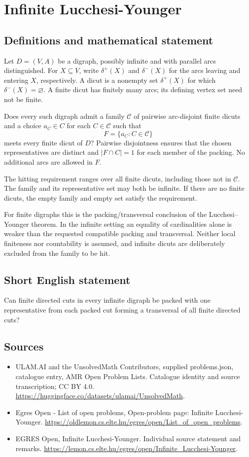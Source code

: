 \documentclass[11pt,a4paper]{article}
\begin{document}
\section*{Infinite Lucchesi-Younger}\label{statement}

\subsection{Definitions and mathematical statement}
Let $D=(V,A)$ be a digraph, possibly infinite and with parallel arcs
distinguished. For $X\subseteq V$, write $\delta^+(X)$ and
$\delta^-(X)$ for the arcs leaving and entering $X$, respectively.
A dicut is a nonempty set $\delta^+(X)$ for which
$\delta^-(X)=\varnothing$. A finite dicut has finitely many arcs;
its defining vertex set need not be finite.

Does every such digraph admit a family $\mathcal C$ of pairwise
arc-disjoint finite dicuts and a choice $a_C\in C$ for each
$C\in\mathcal C$ such that
\[
                  F=\{a_C:C\in\mathcal C\}
\]
meets every finite dicut of $D$? Pairwise disjointness ensures that
the chosen representatives are distinct and $|F\cap C|=1$ for each
member of the packing. No additional arcs are allowed in $F$.

The hitting requirement ranges over all finite dicuts, including those
not in $\mathcal C$. The family and its representative set may both
be infinite. If there are no finite dicuts, the empty family and empty
set satisfy the requirement.

For finite digraphs this is the packing/transversal conclusion of the
Lucchesi--Younger theorem. In the infinite setting an equality of
cardinalities alone is weaker than the requested compatible packing
and transversal. Neither local finiteness nor countability is assumed,
and infinite dicuts are deliberately excluded from the family to be hit.
\subsection{Short English statement}
Can finite directed cuts in every infinite digraph be packed with one representative from each packed cut forming a transversal of all finite directed cuts?
\subsection{Sources}
\begin{itemize}
\item[S1] ULAM.AI and the UnsolvedMath Contributors, supplied problems.json, catalogue entry, AMR Open Problem Lists. Catalogue identity and source transcription; CC BY 4.0.
\url{https://huggingface.co/datasets/ulamai/UnsolvedMath}.
\item[S2] Egres Open - List of open problems, Open-problem page: Infinite Lucchesi-Younger. 
\url{https://oldlemon.cs.elte.hu/egres/open/List_of_open_problems}.
\item[S3] EGRES Open, Infinite Lucchesi-Younger. Individual source statement and remarks.
\url{https://lemon.cs.elte.hu/egres/open/Infinite_Lucchesi-Younger}.
\end{itemize}
\end{document}
